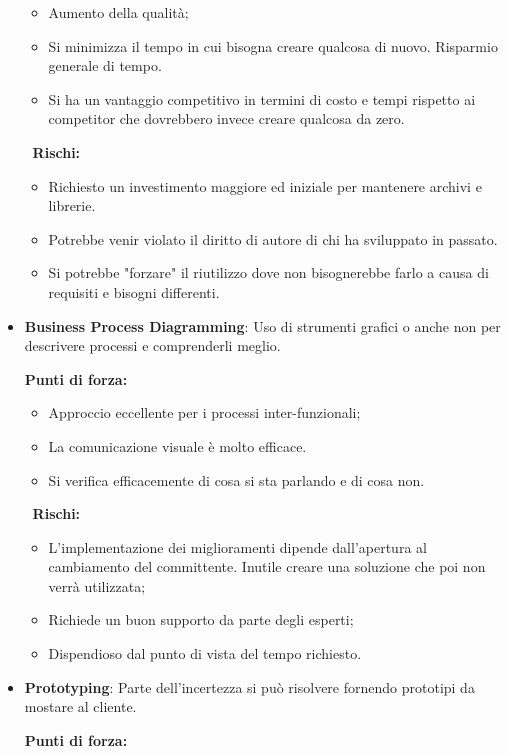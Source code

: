 \begin{itemize}
\begin{info}[]
\begin{itemize}
			\item Aumento della qualità;
			\item Si minimizza il tempo in cui bisogna creare qualcosa di nuovo. Risparmio generale di tempo.
			\item Si ha un vantaggio competitivo in termini di costo e tempi rispetto ai competitor che dovrebbero invece creare qualcosa da zero.
		\end{itemize}
		$\;\;$\textbf{Rischi:}
		\begin{itemize}
			\item Richiesto un investimento maggiore ed iniziale per mantenere archivi e librerie.
			\item Potrebbe venir violato il diritto di autore di chi ha sviluppato in passato.
			\item Si potrebbe "forzare" il riutilizzo dove non bisognerebbe farlo a causa di requisiti e bisogni differenti.
		\end{itemize}
	\end{info}
	\item \textbf{Business Process Diagramming}: Uso di strumenti grafici o anche non per descrivere processi e comprenderli meglio.
	\begin{info}[]
		\textbf{Punti di forza:}
		\begin{itemize}
			\item Approccio eccellente per i processi inter-funzionali;
			\item La comunicazione visuale è molto efficace.
			\item Si verifica efficacemente di cosa si sta parlando e di cosa non.
		\end{itemize}
		$\;\;$\textbf{Rischi:}
		\begin{itemize}
			\item L'implementazione dei miglioramenti dipende dall'apertura al cambiamento del committente. Inutile creare una soluzione che poi non verrà utilizzata;
			\item Richiede un buon supporto da parte degli esperti;
			\item Dispendioso dal punto di vista del tempo richiesto.
		\end{itemize}
	\end{info}
	\item \textbf{Prototyping}: Parte dell'incertezza si può risolvere fornendo prototipi da mostare al cliente.
	\begin{info}[]
		\textbf{Punti di forza:}
		\begin{itemize}

\end{itemize}
\end{info}
\end{itemize}
